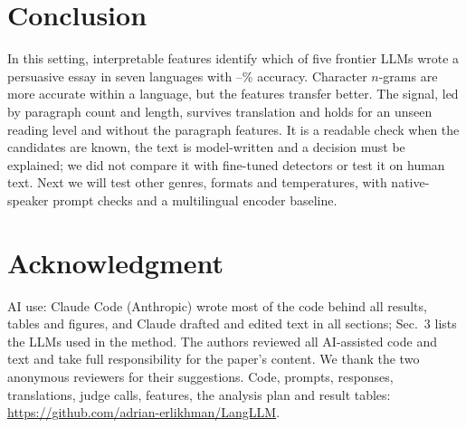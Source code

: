 \documentclass[conference,compsoc]{IEEEtran}
\begin{document}
\section{Conclusion}
In this setting, \NFeatures{} interpretable features identify which of five frontier LLMs wrote a persuasive essay in seven languages with \LRmin{}--\LRmax{}\% accuracy. Character $n$-grams are more accurate within a language, but the features transfer better. The signal, led by paragraph count and length, survives translation and holds for an unseen reading level and without the paragraph features. It is a readable check when the candidates are known, the text is model-written and a decision must be explained; we did not compare it with fine-tuned detectors or test it on human text. Next we will test other genres, formats and temperatures, with native-speaker prompt checks and a multilingual encoder baseline.

\section*{Acknowledgment}
AI use: Claude Code (Anthropic) wrote most of the code behind all results, tables and figures, and Claude drafted and edited text in all sections; Sec.~3 lists the LLMs used in the method. The authors reviewed all AI-assisted code and text and take full responsibility for the paper's content. We thank the two anonymous reviewers for their suggestions. Code, prompts, responses, translations, judge calls, features, the analysis plan and result tables: \url{https://github.com/adrian-erlikhman/LangLLM}.



\end{document}
